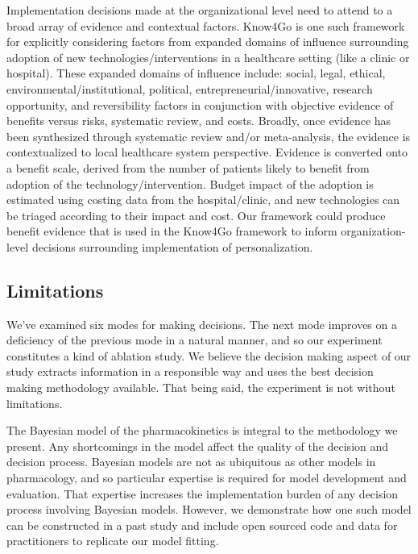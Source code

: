Implementation decisions made at the organizational level need to attend to a broad array of evidence and contextual factors. Know4Go \cite{martin2016hospital} is one such framework for explicitly considering factors from expanded domains of influence surrounding adoption of new technologies/interventions in a healthcare setting (like a clinic or hospital). These expanded domains of influence include: social, legal, ethical, environmental/institutional, political, entrepreneurial/innovative, research opportunity, and reversibility factors in conjunction with objective evidence of benefits versus risks, systematic review, and costs.  Broadly, once evidence has been synthesized through systematic review and/or meta-analysis, the evidence is contextualized to local healthcare system perspective.  Evidence is converted onto a benefit scale, derived from the number of patients likely to benefit from adoption of the technology/intervention.  Budget impact of the adoption is estimated using costing data from the hospital/clinic, and new technologies can be triaged according to their impact and cost.  Our framework could produce benefit evidence that is used in the Know4Go framework to inform organization-level decisions surrounding implementation of personalization.


\subsection{Limitations}

We’ve examined six modes for making decisions.  The next mode improves on a deficiency of the previous mode in a natural manner, and so our experiment constitutes a kind of ablation study.  We believe the decision making aspect of our study extracts information in a responsible way and uses the best decision making methodology available.  That being said, the experiment is not without limitations.

The Bayesian model of the pharmacokinetics is integral to the methodology we present.  Any shortcomings in the model affect the quality of the decision and decision process.  Bayesian models are not as ubiquitous as other models in pharmacology, and so particular expertise is required for model development and evaluation.  That expertise increases the implementation burden of any decision process involving Bayesian models.  However, we demonstrate how one such model can be constructed in a past study \cite{pananos2020comparisons} and include open sourced code and data for practitioners to replicate our model fitting.

